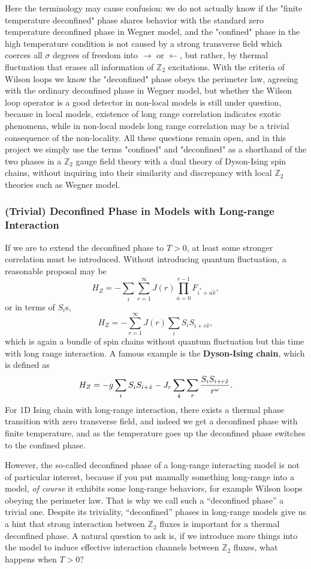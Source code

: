 \documentclass[hyperref, a4paper]{article}
\newcommand*{\concept}[1]{{\textbf{#1}}}
\newcommand*{\Ztwo}{$\mathbb{Z}_2$ }
\begin{document}
Here the terminology may cause confusion: we do not actually know if the "finite temperature deconfined" phase shares behavior with the standard zero temperature deconfined phase in Wegner model, and the "confined" phase in the high temperature condition is not caused by a strong transverse field which coerces all $\sigma$ degrees of freedom into $\rightarrow$ or $\leftarrow$, but rather, by thermal fluctuation that erases all information of \Ztwo excitations.
With the criteria of Wilson loops we know the "deconfined" phase obeys the perimeter law, agreeing with the ordinary deconfined phase in Wegner model, but whether the Wilson loop operator is a good detector in non-local models is still under question, because in local models, existence of long range correlation indicates exotic phenomena, while in non-local models long range correlation may be a trivial consequence of the non-locality.
All these questions remain open, and in this project we simply use the terms "confined" and "deconfined" as a shorthand of the two phases in a \Ztwo gauge field theory with a dual theory of Dyson-Ising spin chains, without inquiring into their similarity and discrepancy with local \Ztwo theories such as Wegner model.

\subsubsection{(Trivial) Deconfined Phase in Models with Long-range Interaction}

If we are to extend the deconfined phase to $T>0$, at least some stronger correlation must be introduced.
Without introducing quantum fluctuation, a reasonable proposal may be 
\[
    H_Z = - \sum_i \sum_{r=1}^\infty J(r) \prod_{a=0}^{r-1} F_{i^*+a \hat{x}},
\]
or in terms of $S_i$s,
\[
    H_Z = - \sum_{r=1}^\infty J(r) \sum_i S_i S_{i + r \hat{x}} ,
\]
which is again a bundle of spin chains without quantum fluctuation but this time with long range interaction.
A famous example is the \concept{Dyson-Ising chain}, which is defined as
\[
    H_Z = - g \sum_i S_i S_{i+\hat{x}} - J_r \sum_{\vb*{i}} \sum_r \frac{S_i S_{i + r \hat{x}}}{r^\omega}.
\]
For 1D Ising chain with long-range interaction, there exists a thermal phase transition with zero transverse field, and indeed we get a deconfined phase with finite temperature, and as the temperature goes up the deconfined phase switches to the confined phase.

However, the so-called deconfined phase of a long-range interacting model is not of particular interest, because if you put manually something long-range into a model, \emph{of course} it exhibits some long-range behaviors, for example Wilson loops obeying the perimeter law.
That is why we call such a ``deconfined phase'' a trivial one.
Despite its triviality, ``deconfined'' phases in long-range models give us a hint that strong interaction between \Ztwo fluxes is important for a thermal deconfined phase.
A natural question to ask is, if we introduce more things into the model to induce effective interaction channels between \Ztwo fluxes, what happens when $T > 0$?
\end{document}
